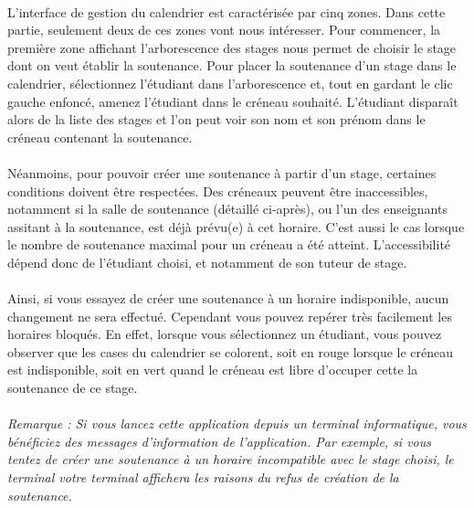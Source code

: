 \documentclass[a4paper,10pt]{report}
\begin{document}
	\paragraph{}
	  L'interface de gestion du calendrier est caractérisée par cinq zones.
	  Dans cette partie, seulement deux de ces zones vont nous intéresser.
	  Pour commencer, la première zone affichant l'arborescence des stages nous permet de choisir le stage dont on veut établir la soutenance.
	  Pour placer la soutenance d'un stage dans le calendrier, sélectionnez l'étudiant dans l'arborescence et, tout en gardant le clic gauche enfoncé, amenez l'étudiant dans le créneau souhaité.
	  L'étudiant disparaît alors de la liste des stages et l'on peut voir son nom et son prénom dans le créneau contenant la soutenance.
	  
	\paragraph{}
	  Néanmoins, pour pouvoir créer une soutenance à partir d'un stage, certaines conditions doivent être respectées.
	  Des créneaux peuvent être inaccessibles, notamment si la salle de soutenance (détaillé ci-après), ou l'un des enseignants assitant à la soutenance, est déjà prévu(e) à cet horaire.
	  C'est aussi le cas lorsque le nombre de soutenance maximal pour un créneau a été atteint.
	  L'accessibilité dépend donc de l'étudiant choisi, et notamment de son tuteur de stage.
	
	\paragraph{}
	  Ainsi, si vous essayez de créer une soutenance à un horaire indisponible, aucun changement ne sera effectué.
	  Cependant vous pouvez repérer très facilement les horaires bloqués.
	  En effet, lorsque vous sélectionnez un étudiant, vous pouvez observer que les cases du calendrier se colorent, soit en rouge lorsque le créneau est indisponible, soit en vert quand le créneau est libre d'occuper cette la soutenance de ce stage.
	  
	\paragraph{}
	  \textit{Remarque : Si vous lancez cette application depuis un terminal informatique, vous bénéficiez des messages d'information de l'application. Par exemple, si vous tentez de créer une soutenance à un horaire incompatible avec le stage choisi, le terminal votre terminal affichera les raisons du refus de création de la soutenance.}
	
\end{document}
